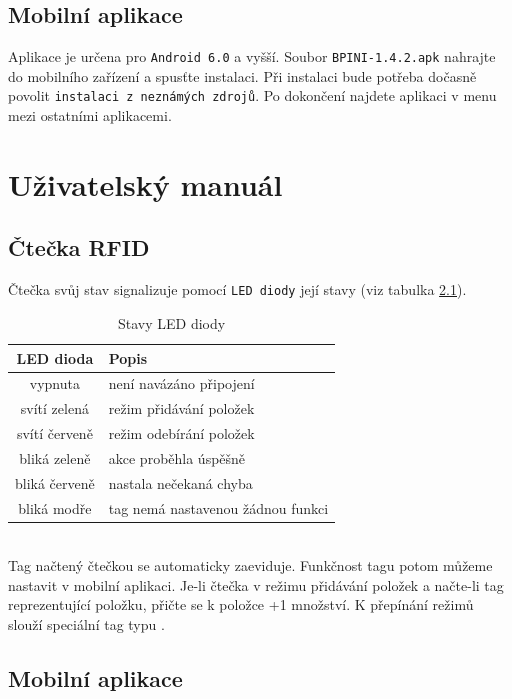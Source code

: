 \documentclass[czech,BP]{thesiskiv}
\begin{document}
\section{Mobilní aplikace}
Aplikace je určena pro \texttt{Android 6.0} a vyšší.	
Soubor \texttt{BPINI-1.4.2.apk} nahrajte do mobilního zařízení a spusťte instalaci.
Při instalaci bude potřeba dočasně povolit \texttt{instalaci z neznámých zdrojů}.
Po dokončení najdete aplikaci v menu mezi ostatními aplikacemi.


\chapter{Uživatelský manuál}

	\section{Čtečka RFID}
Čtečka svůj stav signalizuje pomocí \texttt{LED diody} její stavy (viz tabulka \ref{table:led_states}).

\begin{table}[H]
\centering
\begin{tabular}{ c | p{6cm} }
\textbf{LED dioda} & \textbf{Popis} \\ \hline\hline
vypnuta & není navázáno připojení \\ \hline  
svítí zelená & režim přidávání položek \\ \hline
svítí červeně & režim odebírání položek \\ \hline
bliká zeleně & akce proběhla úspěšně \\ \hline
bliká červeně & nastala nečekaná chyba  \\ \hline
bliká modře & tag nemá nastavenou žádnou funkci  \\ \hline
\end{tabular}
\caption{Stavy LED diody}
\label{table:led_states}
\end{table}
\ \\
Tag načtený čtečkou se automaticky zaeviduje. Funkčnost tagu potom můžeme nastavit v mobilní aplikaci.
Je-li čtečka v režimu přidávání položek a načte-li tag reprezentující položku, přičte se k položce +1 množství.
K přepínání režimů slouží speciální tag typu .

\newpage

\section{Mobilní aplikace}
	
\end{document}
